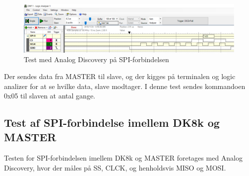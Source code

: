 \begin{figure}[H]
	\centering
\includegraphics[scale=0.25]{Screenshots/Logic_analyzer}
\caption{Test med Analog Discovery på SPI-forbindelsen}
\end{figure}

Der sendes data fra MASTER til slave, og der kigges på terminalen og logic analizer for at se hvilke data, slave modtager. I denne test sendes kommandoen 0x05 til 
slaven at antal gange.

\subsection{Test af SPI-forbindelse imellem DK8k og MASTER}

Testen for SPI-forbindelsen imellem DK8k og MASTER foretages med Analog Discovery, hvor der måles på SS, CLCK, og henholdsvis MISO og MOSI.

